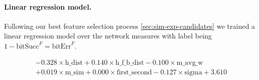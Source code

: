 \paragraph{Linear regression model.} 

Following our best feature selection process \ref{sec:sim-exp-candidates} we trained a linear regression model over the network measures with label being $1-\mbox{bitSucc}^F = \mbox{bitErr}^F$. 

\begin{align} 
- 0.328 \times \mbox{h\_dist}
+ 0.140 \times \mbox{h\_f\_b\_dist}
- 0.100 \times \mbox{m\_avg\_w} \nonumber \\
+ 0.019 \times \mbox{m\_sim}
+ 0.000 \times \mbox{first\_second}
- 0.127 \times \mbox{sigma}
+ 3.610
\end{align} 
